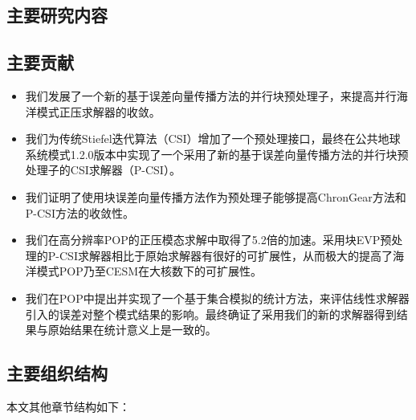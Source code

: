 \subsection{主要研究内容}
\subsection{主要贡献}
\begin{itemize}
\item  
我们发展了一个新的基于误差向量传播方法的并行块预处理子\cite{roache1995elliptic}，来提高并行海洋模式正压求解器的收敛。 
\item  
我们为传统Stiefel迭代算法（CSI）\cite{hu2013scalable}增加了一个预处理接口，最终在公共地球系统模式1.2.0版本中实现了一个采用了新的基于误差向量传播方法的并行块预处理子的CSI求解器（P-CSI）。
\item  
我们证明了使用块误差向量传播方法作为预处理子能够提高ChronGear方法和P-CSI方法的收敛性。 
\item  
我们在高分辨率POP的正压模态求解中取得了5.2倍的加速。采用块EVP预处理的P-CSI求解器相比于原始求解器有很好的可扩展性，从而极大的提高了海洋模式POP乃至CESM在大核数下的可扩展性。 
\item  
我们在POP中提出并实现了一个基于集合模拟的统计方法，来评估线性求解器引入的误差对整个模式结果的影响。最终确证了采用我们的新的求解器得到结果与原始结果在统计意义上是一致的。 
\end{itemize}
\subsection{主要组织结构}
本文其他章节结构如下：


